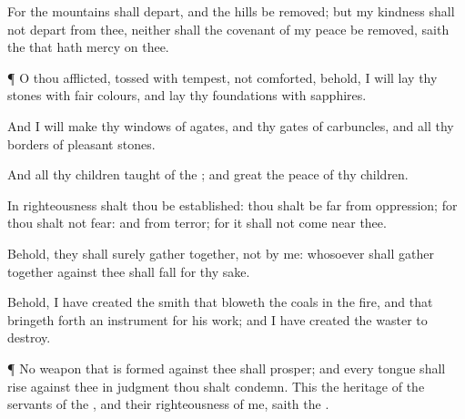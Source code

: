 {For the
mountains shall
depart, and the
hills be
removed; but my
kindness shall not
depart from thee, neither shall the
covenant of my
peace be
removed,
saith the
{} that hath
mercy on thee.


\par }{\PP {}¶ O thou
afflicted, tossed with
tempest,
{} not
comforted, behold, I will
lay thy
stones with fair
colours, and lay thy
foundations with
sapphires.

And I will
make thy
windows of
agates, and thy
gates of
carbuncles, and all thy
borders of
pleasant
stones.

And all thy
children
{}
taught of the
{}; and
great
{} the
peace of thy
children.

In
righteousness shalt thou be
established: thou shalt be
far from
oppression; for thou shalt not
fear: and from
terror; for it shall not come
near thee.

Behold, they shall
surely gather
together,
{}
not by me:
whosoever shall gather
together against thee shall
fall for thy sake.

Behold, I have
created the
smith that
bloweth the
coals in the
fire, and that bringeth
forth an
instrument for his
work; and I have
created the
waster to
destroy.


\par }{\PP {}¶ No
weapon that is
formed against thee shall
prosper; and every
tongue
{} shall
rise against thee in
judgment thou shalt
condemn. This
{} the
heritage of the
servants of the
{}, and their
righteousness
{} of me,
saith the
{}.




\par }
